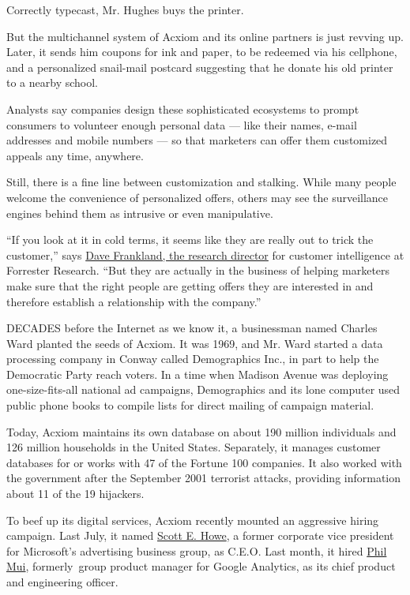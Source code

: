 Correctly typecast, Mr. Hughes buys the printer.

But the multichannel system of Acxiom and its online partners is just
revving up. Later, it sends him coupons for ink and paper, to be
redeemed via his cellphone, and a personalized snail-mail postcard
suggesting that he donate his old printer to a nearby school.

Analysts say companies design these sophisticated ecosystems to prompt
consumers to volunteer enough personal data --- like their names, e-mail
addresses and mobile numbers --- so that marketers can offer them
customized appeals any time, anywhere.

Still, there is a fine line between customization and stalking. While
many people welcome the convenience of personalized offers, others may
see the surveillance engines behind them as intrusive or even
manipulative.

``If you look at it in cold terms, it seems like they are really out to
trick the customer,'' says
\href{http://www.forrester.com/Dave-Frankland}{Dave Frankland, the
research director} for customer intelligence at Forrester Research.
``But they are actually in the business of helping marketers make sure
that the right people are getting offers they are interested in and
therefore establish a relationship with the company.''

DECADES before the Internet as we know it, a businessman named Charles
Ward planted the seeds of Acxiom. It was 1969, and Mr. Ward started a
data processing company in Conway called Demographics Inc., in part to
help the Democratic Party reach voters. In a time when Madison Avenue
was deploying one-size-fits-all national ad campaigns, Demographics and
its lone computer used public phone books to compile lists for direct
mailing of campaign material.

Today, Acxiom maintains its own database on about 190 million
individuals and 126 million households in the United States. Separately,
it manages customer databases for or works with 47 of the Fortune 100
companies. It also worked with the government after the September 2001
terrorist attacks, providing information about 11 of the 19 hijackers.

To beef up its digital services, Acxiom recently mounted an aggressive
hiring campaign. Last July, it named
\href{http://www.acxiom.com/about-acxiom/corporate-governance/board-of-directors/scott-e--howe/}{Scott
E. Howe}, a former corporate vice president for Microsoft's advertising
business group, as C.E.O. Last month, it hired
\href{http://www.acxiom.com/about-acxiom/corporate-governance/company-leadership/phil-mui,-ph-d-/}{Phil
Mui}, formerly~group product manager for Google Analytics, as its chief
product and engineering officer.

